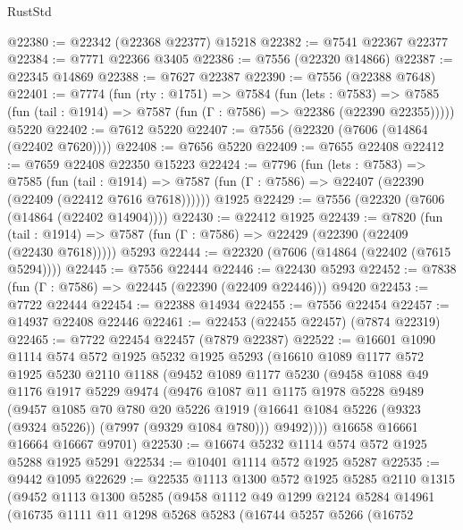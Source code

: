 \begin{lexlean}{RustStd}
\begin{coremodule}
@22380 := @22342 (@22368 @22377) @15218
@22382 := @7541 @22367 @22377
@22384 := @7771 @22366 @3405
@22386 := @7556 (@22320 @14866)
@22387 := @22345 @14869
@22388 := @7627 @22387
@22390 := @7556 (@22388 @7648)
@22401 := @7774
    (fun (rty : @1751) =>
    @7584
      (fun (lets : @7583) =>
      @7585 (fun (tail : @1914) => @7587 (fun (Γ : @7586) => @22386 (@22390 @22355)))))
    @5220
@22402 := @7612 @5220
@22407 := @7556 (@22320 (@7606 (@14864 (@22402 @7620))))
@22408 := @7656 @5220
@22409 := @7655 @22408
@22412 := @7659 @22408 @22350 @15223
@22424 := @7796
    (fun (lets : @7583) =>
    @7585
      (fun (tail : @1914) =>
      @7587 (fun (Γ : @7586) => @22407 (@22390 (@22409 (@22412 @7616 @7618))))))
    @1925
@22429 := @7556 (@22320 (@7606 (@14864 (@22402 @14904))))
@22430 := @22412 @1925
@22439 := @7820
    (fun (tail : @1914) => @7587 (fun (Γ : @7586) => @22429 (@22390 (@22409 (@22430 @7618)))))
    @5293
@22444 := @22320 (@7606 (@14864 (@22402 (@7615 @5294))))
@22445 := @7556 @22444
@22446 := @22430 @5293
@22452 := @7838 (fun (Γ : @7586) => @22445 (@22390 (@22409 @22446))) @9420
@22453 := @7722 @22444
@22454 := @22388 @14934
@22455 := @7556 @22454
@22457 := @14937 @22408 @22446
@22461 := @22453 (@22455 @22457) (@7874 @22319)
@22465 := @7722 @22454 @22457 (@7879 @22387)
@22522 := @16601
    @1090
    @1114
    @574
    @572
    @1925
    @5232
    @1925
    @5293
    (@16610
      @1089
      @1177
      @572
      @1925
      @5230
      @2110
      @1188
      (@9452
        @1089
        @1177
        @5230
        (@9458
          @1088
          @49
          @1176
          @1917
          @5229
          @9474
          (@9476
            @1087
            @11
            @1175
            @1978
            @5228
            @9489
            (@9457
              @1085
              @70
              @780
              @20
              @5226
              @1919
              (@16641 @1084 @5226 (@9323 (@9324 @5226)) (@7997 (@9329 @1084 @780)))
              @9492))))
      @16658
      @16661
      @16664
      @16667
      @9701)
@22530 := @16674 @5232 @1114 @574 @572 @1925 @5288 @1925 @5291
@22534 := @10401 @1114 @572 @1925 @5287
@22535 := @9442 @1095
@22629 := @22535
    @1113
    @1300
    @572
    @1925
    @5285
    @2110
    @1315
    (@9452
      @1113
      @1300
      @5285
      (@9458
        @1112
        @49
        @1299
        @2124
        @5284
        @14961
        (@16735
          @1111
          @11
          @1298
          @5268
          @5283
          (@16744
            @5257
            @5266
            (@16752

\end{coremodule}
\end{lexlean}
